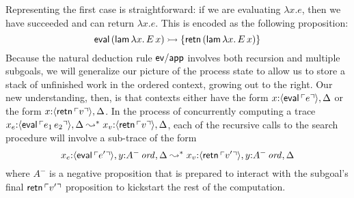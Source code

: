 Representing the first case is straightforward: if we are evaluating
$\lambda x.e$, then we have succeeded and can return $\lambda x.e$. 
This is encoded as the following proposition:
\[
{\sf eval}\,({\sf lam}\,\lambda x.\,E\,x)
   \rightarrowtail \{ {\sf retn}\,({\sf lam}\,\lambda x.\,E\,x) \}
\]
Because the natural deduction rule ${\sf ev/app}$ 
involves both recursion and multiple subgoals,
we will generalize our picture of the process state to allow us to store a
stack of unfinished work in the ordered context, growing out to the
right. Our new understanding, then, is that contexts either have the
form $x{:}\langle {{\sf eval}\,{\ulcorner{e}\urcorner}} \rangle, \Delta$ or the form $x{:}\langle {{\sf
  retn}\,{\ulcorner{v}\urcorner}} \rangle, \Delta$. In the process of concurrently
computing a trace $x_e{:}\langle {{\sf eval}\,{\ulcorner{e_1\,e_2}\urcorner}} \rangle, \Delta
\leadsto^* x_v{:}\langle {{\sf retn}\,{\ulcorner{v}\urcorner}} \rangle, \Delta$, each of the
recursive calls to the search procedure will involve a sub-trace of the
form
%
\[x_e{:}\langle {{\sf eval}\,{\ulcorner{e'}\urcorner}} \rangle, y{:}{A^-}\,{{\it ord}}, \Delta
  \leadsto^*
  x_v{:}\langle {{\sf retn}\,{\ulcorner{v'}\urcorner}} \rangle, y{:}{A^-}\,{{\it ord}}, \Delta\]
%
  where $A^-$ is a negative proposition that is prepared to interact
  with the subgoal's final ${\sf retn}\,{\ulcorner{v'}\urcorner}$ proposition to
  kickstart the rest of the computation.

